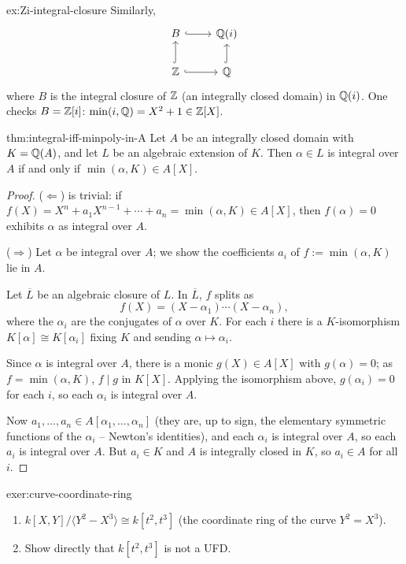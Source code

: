\begin{example}{}{ex:Zi-integral-closure}
Similarly,
\[
\begin{tikzcd}
B \arrow[r, hook] & \bbq(i) \\
\bbz \arrow[u, hook] \arrow[r, hook] & \bbq \arrow[u, hook]
\end{tikzcd}
\]
where $B$ is the integral closure of $\mathbb{Z}$ (an integrally closed domain) in $\mathbb{Q}(i)$. One checks $B = \mathbb{Z}[i]$: $\min(i,\mathbb{Q}) = X^2+1 \in \mathbb{Z}[X]$.
\end{example}

\begin{theorem}{}{thm:integral-iff-minpoly-in-A}
Let $A$ be an integrally closed domain with $K = \mathbb{Q}(A)$, and let $L$ be an algebraic extension of $K$. Then $\alpha \in L$ is integral over $A$ if and only if $\min(\alpha,K) \in A[X]$.
\end{theorem}

\begin{proof}
($\Leftarrow$) is trivial: if $f(X) = X^n+a_1X^{n-1}+\cdots+a_n = \min(\alpha,K) \in A[X]$, then $f(\alpha)=0$ exhibits $\alpha$ as integral over $A$.

($\Rightarrow$) Let $\alpha$ be integral over $A$; we show the coefficients $a_i$ of $f := \min(\alpha,K)$ lie in $A$.

Let $\overline L$ be an algebraic closure of $L$. In $\overline L$, $f$ splits as
\[
f(X) = (X-\alpha_1)\cdots(X-\alpha_n),
\]
where the $\alpha_i$ are the conjugates of $\alpha$ over $K$. For each $i$ there is a $K$-isomorphism $K[\alpha] \cong K[\alpha_i]$ fixing $K$ and sending $\alpha \mapsto \alpha_i$.

Since $\alpha$ is integral over $A$, there is a monic $g(X) \in A[X]$ with $g(\alpha)=0$; as $f = \min(\alpha,K)$, $f \mid g$ in $K[X]$. Applying the isomorphism above, $g(\alpha_i)=0$ for each $i$, so each $\alpha_i$ is integral over $A$.

Now $a_1,\ldots,a_n \in A[\alpha_1,\ldots,\alpha_n]$ (they are, up to sign, the elementary symmetric functions of the $\alpha_i$ -- Newton's identities), and each $\alpha_i$ is integral over $A$, so each $a_i$ is integral over $A$. But $a_i \in K$ and $A$ is integrally closed in $K$, so $a_i \in A$ for all $i$.
\end{proof}

\begin{exercise}{}{exer:curve-coordinate-ring}
\begin{enumerate}[label=(\arabic*)]
    \item $k[X,Y]/\langle Y^2-X^3\rangle \cong k[t^2,t^3]$ (the coordinate ring of the curve $Y^2=X^3$).
    \item Show directly that $k[t^2,t^3]$ is not a UFD.
\end{enumerate}
\end{exercise}

